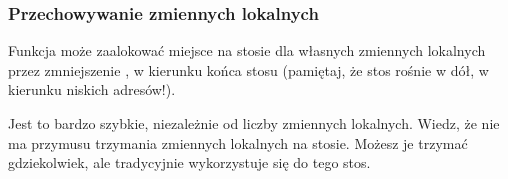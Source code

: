 \subsubsection{Przechowywanie zmiennych lokalnych}

Funkcja może zaalokować miejsce na stosie dla własnych zmiennych lokalnych przez zmniejszenie
, w kierunku końca stosu (pamiętaj, że stos rośnie w dół, w kierunku niskich adresów!).


Jest to bardzo szybkie, niezależnie od liczby zmiennych lokalnych.
Wiedz, że nie ma przymusu trzymania zmiennych lokalnych na stosie. Możesz je trzymać gdziekolwiek, ale tradycyjnie wykorzystuje się do tego stos.

